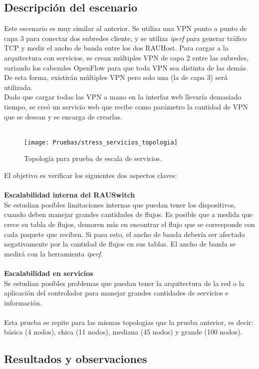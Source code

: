 \subsection{Descripción del escenario}
Este escenario es muy similar al anterior. Se utiliza una VPN punto a punto de capa 3 para conectar dos subredes cliente, y se utiliza \textit{iperf} para generar tráfico TCP y medir el ancho de banda entre los dos RAUHost. Para cargar a la arquitectura con servicios, se crean múltiples VPN de capa 2 entre las subredes, variando los cabezales OpenFlow para que toda VPN sea distinta de las demás. De esta forma, existirán múltiples VPN pero solo una (la de capa 3) será utilizada. \\
Dado que cargar todas las VPN a mano en la interfaz web llevaría demasiado tiempo, se creó un servicio web que recibe como parámetro la cantidad de VPN que se desean y se encarga de crearlas. \\ \\
\begin{figure}[t]
	\caption{Topología para prueba de escala de servicios.}
	\texttt{[image: Pruebas/stress\_servicios\_topologia]}
	\centering
	\label{fig:stress_servicios_topologia}
\end{figure}
El objetivo es verificar los siguientes dos aspectos claves: \\ \\
\textbf{Escalabilidad interna del RAUSwitch} \\
Se estudian posibles limitaciones internas que puedan tener los dispositivos, cuando deben manejar grandes cantidades de flujos. Es posible que a medida que crece su tabla de flujos, demoren más en encontrar el flujo que se corresponde con cada paquete que reciben. Si pasa esto, el ancho de banda debería ser afectado negativamente por la cantidad de flujos en sus tablas. El ancho de banda se medirá con la herramienta \textit{iperf}.  \\ \\
\textbf{Escalabilidad en servicios} \\
Se estudian posibles problemas que puedan tener la arquitectura de la red o la aplicación del controlador para manejar grandes cantidades de servicios e información. \\ \\
Esta prueba se repite para las mismas topologias que la prueba anterior, es decir: básica (4 nodos), chica (11 nodos), mediana (45 nodos) y grande (100 nodos).

\subsection{Resultados y observaciones}

